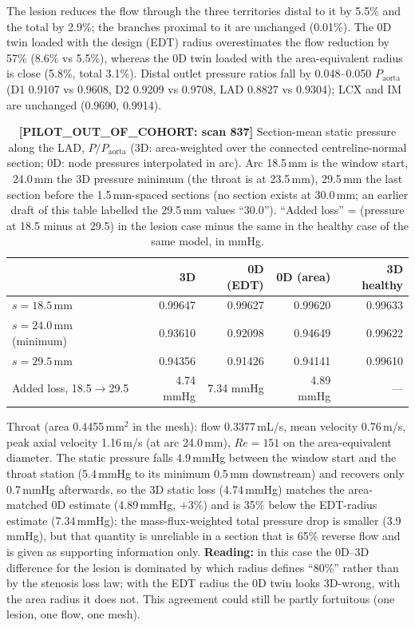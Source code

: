 \documentclass[11pt]{article}
\begin{document}
The lesion reduces the flow through the three territories distal to it by 5.5\% and the total by 2.9\%; the branches proximal to it are unchanged (0.01\%). The 0D twin loaded with the design (EDT) radius overestimates
the flow reduction by 57\% (8.6\% vs 5.5\%), whereas the 0D twin loaded with the area-equivalent radius is close (5.8\%, total 3.1\%). Distal outlet pressure ratios fall by 0.048--0.050 $P_\text{aorta}$
(D1 0.9107 vs 0.9608, D2 0.9209 vs 0.9708, LAD 0.8827 vs 0.9304); LCX and IM are unchanged (0.9690, 0.9914).

\begin{table}[H]
\centering
\caption{\textbf{[PILOT\_OUT\_OF\_COHORT: scan 837]} Section-mean static pressure along the LAD, $P/P_\text{aorta}$ (3D: area-weighted over the connected centreline-normal section; 0D: node pressures interpolated in arc). Arc 18.5\,mm is the window start, 24.0\,mm the 3D pressure minimum
(the throat is at 23.5\,mm), 29.5\,mm the last section before the 1.5\,mm-spaced sections (no section exists at 30.0\,mm; an earlier draft of this table labelled the 29.5\,mm values ``30.0''). ``Added loss'' = (pressure at 18.5 minus at 29.5) in the lesion case minus the same in the healthy case of the same model, in mmHg.}
\begin{tabular}{lrrrr}
\toprule
& 3D & 0D (EDT) & 0D (area) & 3D healthy \\
\midrule
$s=18.5$\,mm & 0.99647 & 0.99627 & 0.99620 & 0.99633 \\
$s=24.0$\,mm (minimum) & 0.93610 & 0.92098 & 0.94649 & 0.99622 \\
$s=29.5$\,mm & 0.94356 & 0.91426 & 0.94141 & 0.99610 \\
Added loss, 18.5$\to$29.5 & 4.74 mmHg & 7.34 mmHg & 4.89 mmHg & --- \\
\bottomrule
\end{tabular}
\end{table}

Throat (area 0.4455\,mm$^2$ in the mesh): flow 0.3377\,mL/s, mean velocity 0.76\,m/s, peak axial velocity 1.16\,m/s (at arc 24.0\,mm), $Re=151$ on the area-equivalent diameter. The static pressure falls 4.9\,mmHg between the window start and
the throat station (5.4\,mmHg to its minimum 0.5\,mm downstream) and recovers only 0.7\,mmHg afterwards, so the 3D static loss (4.74\,mmHg) matches the area-matched 0D estimate (4.89\,mmHg, $+3\%$) and is 35\% below the EDT-radius estimate (7.34\,mmHg); the mass-flux-weighted total pressure drop is smaller (3.9\,mmHg), but that
quantity is unreliable in a section that is 65\% reverse flow and is given as supporting information only. \textbf{Reading:} in this case the 0D--3D difference for the lesion is dominated by which radius defines ``80\%'' rather than by the stenosis loss law; with the EDT radius the
0D twin looks 3D-wrong, with the area radius it does not. This agreement could still be partly fortuitous (one lesion, one flow, one mesh).
\end{document}
